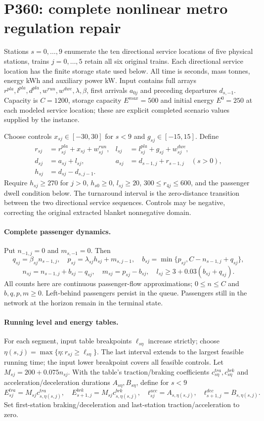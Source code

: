 \documentclass[11pt]{article}
\begin{document}
\section*{P360: complete nonlinear metro regulation repair}
Stations $s=0,\ldots,9$ enumerate the ten directional service locations
of five physical stations, trains $j=0,\ldots,5$ retain all six original trains.
Each directional service location has the finite storage state used below.
All time is seconds, mass tonnes, energy kWh and auxiliary power kW.
Input contains full arrays $r^{pla},l^{pla},d^{pla},w^{run},w^{dwe},
\lambda,\beta$, first arrivals $a_{0j}$ and preceding departures $d_{s,-1}$.
Capacity is $C=1200$, storage capacity $E^{max}=500$ and initial energy
$E^0=250$ at each modeled service location; these are explicit completed
scenario values supplied by the instance.

Choose controls $x_{sj}\in[-30,30]$ for $s<9$ and
$g_{sj}\in[-15,15]$. Define
\begin{align}
r_{sj}&=r^{pla}_{sj}+x_{sj}+w^{run}_{sj},&
l_{sj}&=l^{pla}_{sj}+g_{sj}+w^{dwe}_{sj},\\
d_{sj}&=a_{sj}+l_{sj},&
a_{sj}&=d_{s-1,j}+r_{s-1,j}\quad(s>0),\\
h_{sj}&=d_{sj}-d_{s,j-1}.&&
\end{align}
Require $h_{sj}\ge270$ for $j>0$, $h_{s0}\ge0$, $l_{sj}\ge20$,
$300\le r_{4j}\le600$, and the passenger dwell condition below.
The turnaround interval is the zero-distance transition between the two
directional service sequences. Controls may be negative, correcting the
original extracted blanket nonnegative domain.

\paragraph{Complete passenger dynamics.}
Put $n_{-1,j}=0$ and $m_{s,-1}=0$. Then
\[
 q_{sj}=\beta_{sj}n_{s-1,j},\quad
 p_{sj}=\lambda_{sj}h_{sj}+m_{s,j-1},\quad
 b_{sj}=\min\{p_{sj},C-n_{s-1,j}+q_{sj}\},
\]
\[
 n_{sj}=n_{s-1,j}+b_{sj}-q_{sj},\quad
 m_{sj}=p_{sj}-b_{sj},\quad
 l_{sj}\ge3+0.03(b_{sj}+q_{sj}).
\]
All counts here are continuous passenger-flow approximations;
$0\le n\le C$ and $b,q,p,m\ge0$. Left-behind passengers persist in the queue.
Passengers still in the network at the horizon remain in the terminal state.

\paragraph{Running level and energy tables.}
For each segment, input table breakpoints $\ell_{s\eta}$ increase strictly;
choose $\eta(s,j)=\max\{\eta:r_{sj}\ge\ell_{s\eta}\}$.
The last interval extends to the largest feasible running time;
the input lower breakpoint covers all feasible controls.
Let $M_{sj}=200+0.075n_{sj}$.
With the table's traction/braking coefficients $c^{tra}_{s\eta},
c^{brk}_{s\eta}$ and acceleration/deceleration durations
$A_{s\eta},B_{s\eta}$, define for $s<9$
\[
 E^{tra}_{sj}=M_{sj}c^{tra}_{s,\eta(s,j)},\quad
 E^{brk}_{s+1,j}=M_{sj}c^{brk}_{s,\eta(s,j)},\quad
 t^{acc}_{sj}=A_{s,\eta(s,j)},\quad
 t^{dec}_{s+1,j}=B_{s,\eta(s,j)}.
\]
Set first-station braking/deceleration and last-station
traction/acceleration to zero.
\end{document}
